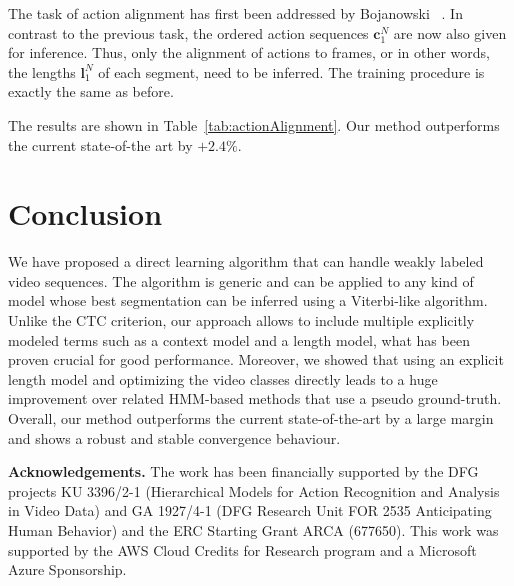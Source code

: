 \documentclass[10pt,twocolumn,letterpaper]{article}
\begin{document}
The task of action alignment has first been addressed by Bojanowski \etal~\cite{bojanowski14weakly}.
In contrast to the previous task, the ordered action sequences $ \mathbf{c}_1^N $
are now also given for inference. Thus, only the alignment of actions to frames,
or in other words, the lengths $ \mathbf{l}_1^N $ of each segment, need to be
inferred. The training procedure is exactly the same as before.

The results are shown in Table~\ref{tab:actionAlignment}. Our method
outperforms the current state-of-the art by $ +2.4\% $.


\section{Conclusion}
\label{sec:conclusion}

We have proposed a direct learning algorithm that can handle weakly labeled
video sequences. The algorithm is generic and can be applied to any kind of model
whose best segmentation can be inferred using a Viterbi-like algorithm.
Unlike the CTC criterion, our approach allows to include multiple
explicitly modeled terms such as a context model and a length model, what has
been proven crucial for good performance.
Moreover, we showed that using an explicit length model and optimizing the
video classes directly leads to a huge improvement over related HMM-based
methods that use a pseudo ground-truth.
Overall, our method outperforms the current state-of-the-art by a large margin
and shows a robust and stable convergence behaviour.

\textbf{Acknowledgements.}
The work has been financially supported by the DFG projects KU 3396/2-1 (Hierarchical Models for Action Recognition and Analysis in Video Data) and
GA 1927/4-1 (DFG Research Unit FOR 2535 Anticipating Human Behavior) and the ERC Starting Grant ARCA (677650).
This work was supported by the AWS Cloud Credits for Research program and a Microsoft Azure Sponsorship.



{\small


}
\end{document}
